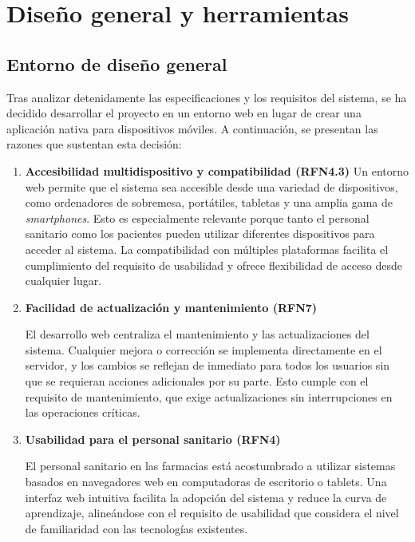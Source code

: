 \chapter{Diseño general y herramientas}


\section{Entorno de diseño general}
Tras analizar detenidamente las especificaciones y los requisitos del sistema, se ha decidido desarrollar el proyecto en un entorno web en lugar de crear una aplicación nativa para dispositivos móviles. A continuación, se presentan las razones que sustentan esta decisión:

\begin{enumerate} 
	\item \textbf{Accesibilidad multidispositivo y compatibilidad (RFN4.3)}
	Un entorno web permite que el sistema sea accesible desde una variedad de dispositivos, como ordenadores de sobremesa, portátiles, tabletas y una amplia gama de \textit{smartphones}. Esto es especialmente relevante porque tanto el personal sanitario como los pacientes pueden utilizar diferentes dispositivos para acceder al sistema. La compatibilidad con múltiples plataformas facilita el cumplimiento del requisito de usabilidad y ofrece flexibilidad de acceso desde cualquier lugar.
	
	\item \textbf{Facilidad de actualización y mantenimiento (RFN7)}
	
	El desarrollo web centraliza el mantenimiento y las actualizaciones del sistema. Cualquier mejora o corrección se implementa directamente en el servidor, y los cambios se reflejan de inmediato para todos los usuarios sin que se requieran acciones adicionales por su parte. Esto cumple con el requisito de mantenimiento, que exige actualizaciones sin interrupciones en las operaciones críticas.
	
	\item \textbf{Usabilidad para el personal sanitario (RFN4)}
	
	El personal sanitario en las farmacias está acostumbrado a utilizar sistemas basados en navegadores web en computadoras de escritorio o tablets. Una interfaz web intuitiva facilita la adopción del sistema y reduce la curva de aprendizaje, alineándose con el requisito de usabilidad que considera el nivel de familiaridad con las tecnologías existentes.
	

\end{enumerate}

